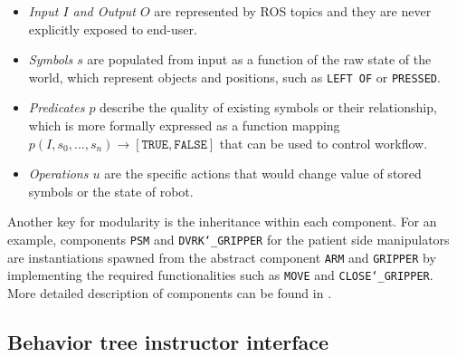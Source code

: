 \documentclass[letterpaper, 10 pt, conference]{ieeeconf}
\begin{document}
\begin{itemize}
\item \textit{Input $I$ and Output $O$} are represented by ROS topics and they are never explicitly exposed to end-user. 
\item \textit{Symbols $s$} are populated from input as a function of the raw state of the world, which represent objects and positions, such as \texttt{LEFT OF} or \texttt{PRESSED}.
\item \textit{Predicates $p$} describe the quality of existing symbols or their relationship, which is more formally expressed as a function mapping $p(I,s_0, ..., s_n) \rightarrow [\texttt{TRUE}, \texttt{FALSE}]$ that can be used to control workflow. 
\item \textit{Operations $u$} are the specific actions that would change value of stored symbols or the state of robot. 

\end{itemize}

Another key for modularity is the inheritance within each component. For an example, components \texttt{PSM} and \texttt{DVRK\char`_GRIPPER} for the patient side manipulators are instantiations spawned from the abstract component \texttt{ARM} and \texttt{GRIPPER} by implementing the required functionalities such as \texttt{MOVE} and \texttt{CLOSE\char`_GRIPPER}. More detailed description of components can be found in \cite{paxton2017costar}.

\subsection{Behavior tree instructor interface}

%
%
\end{document}
